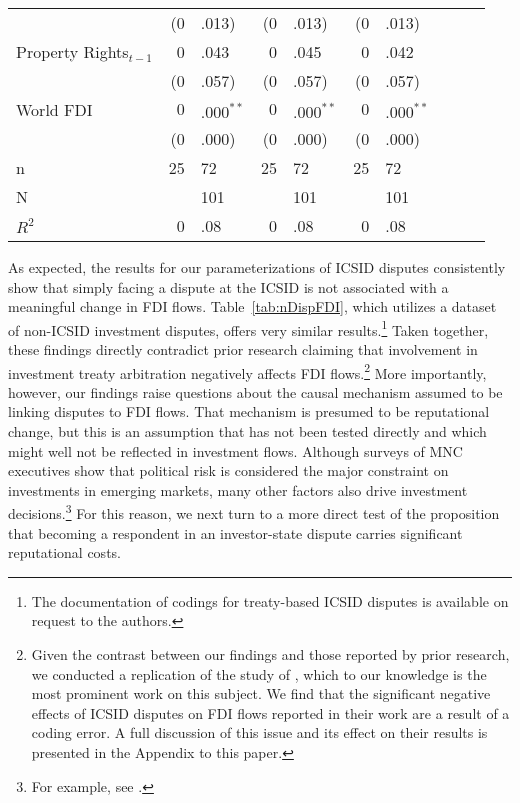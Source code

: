 \documentclass[12pt,onesided]{amsart}
\begin{document}
\begin{table}[ht]
{\begin{tabular}{lr@{} lr@{}lr@{}lr@{}lr@{}}
   & (0&.013) & (0&.013) & (0&.013) \\ 
  Property Rights$_{t-1}$ & 0&.043 & 0&.045 & 0&.042 \\ 
   & (0&.057) & (0&.057) & (0&.057) \\ 
  World FDI & $0$&$.000^{\ast\ast}$ & $0$&$.000^{\ast\ast}$ & $0$&$.000^{\ast\ast}$ \\ 
   & (0&.000) & (0&.000) & (0&.000) \\ 
   \hline
n & 25&72 & 25&72 & 25&72 \\ 
  N && 101 && 101 && 101 \\ 
  $R^{2}$ & 0&.08 & 0&.08 & 0&.08 \\ 
   \hline
\hline
\end{tabular}
}
\end{table}

As expected, the results for our parameterizations of ICSID disputes consistently show that simply facing a dispute at the ICSID is not associated with a meaningful change in FDI flows. Table~\ref{tab:nDispFDI}, which utilizes a dataset of non-ICSID investment disputes, offers very similar results.\footnote{The documentation of codings for treaty-based ICSID disputes is available on request to the authors.}  Taken together, these findings directly contradict prior research claiming that involvement in investment treaty arbitration negatively affects FDI flows.\footnote{Given the contrast between our findings and those reported by prior research, we conducted a replication of the study of \citet{allee:peinhardt:2011}, which to our knowledge is the most prominent work on this subject. We find that the significant negative effects of ICSID disputes on FDI flows reported in their work are a result of a coding error. A full discussion of this issue and its effect on their results is presented in the Appendix to this paper.} More importantly, however, our findings raise questions about the causal mechanism assumed to be linking disputes to FDI flows. That mechanism is presumed to be reputational change, but this is an assumption that has not been tested directly and which might well not be reflected in investment flows. Although surveys of MNC executives show that political risk is considered the major constraint on investments in emerging markets, many other factors also drive investment decisions.\footnote{For example, see \citet{miga:2011}.} For this reason, we next turn to a more direct test of the proposition that becoming a respondent in an investor-state dispute carries significant reputational costs. 
\end{document}

